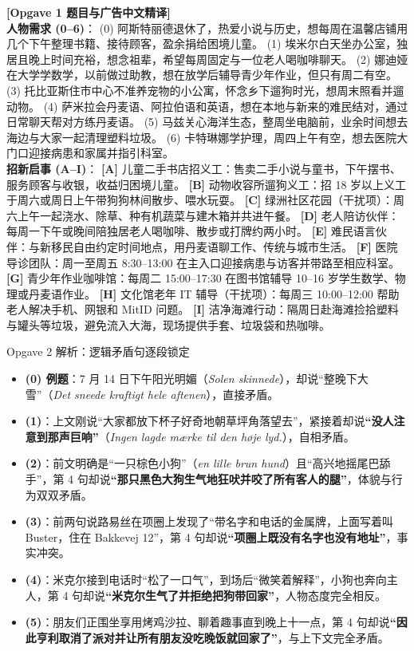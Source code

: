 \begin{transbox}
\small
\textbf{\color{NCDTeal}[Opgave 1 题目与广告中文精译]}\\
\textbf{人物需求 (0--6)}：
(0) 阿斯特丽德退休了，热爱小说与历史，想每周在温馨店铺用几个下午整理书籍、接待顾客，盈余捐给困境儿童。
(1) 埃米尔白天坐办公室，独居且晚上时间充裕，想念祖辈，希望每周固定与一位老人喝咖啡聊天。
(2) 娜迪娅在大学学数学，以前做过助教，想在放学后辅导青少年作业，但只有周二有空。
(3) 托比亚斯住市中心不准养宠物的小公寓，怀念乡下遛狗时光，想周末照看并遛动物。
(4) 萨米拉会丹麦语、阿拉伯语和英语，想在本地与新来的难民结对，通过日常聊天帮对方练丹麦语。
(5) 马兹关心海洋生态，整周坐电脑前，业余时间想去海边与大家一起清理塑料垃圾。
(6) 卡特琳娜学护理，周四上午有空，想去医院大门口迎接病患和家属并指引科室。\\
\textbf{招新启事 (A--I)}：
\textbf{[A]} 儿童二手书店招义工：售卖二手小说与童书，下午摆书、服务顾客与收银，收益归困境儿童。
\textbf{[B]} 动物收容所遛狗义工：招 18 岁以上义工于周六或周日上午带狗狗林间散步、喂水玩耍。
\textbf{[C]} 绿洲社区花园（干扰项）：周六上午一起浇水、除草、种有机蔬菜与建木箱并共进午餐。
\textbf{[D]} 老人陪访伙伴：每周一下午或晚间陪独居老人喝咖啡、散步或打牌约两小时。
\textbf{[E]} 难民语言伙伴：与新移民自由约定时间地点，用丹麦语聊工作、传统与城市生活。
\textbf{[F]} 医院导诊团队：周一至周五 8:30--13:00 在主入口迎接病患与访客并带路至相应科室。
\textbf{[G]} 青少年作业咖啡馆：每周二 15:00--17:30 在图书馆辅导 10--16 岁学生数学、物理或丹麦语作业。
\textbf{[H]} 文化馆老年 IT 辅导（干扰项）：每周三 10:00--12:00 帮助老人解决手机、网银和 MitID 问题。
\textbf{[I]} 洁净海滩行动：隔周日赴海滩捡拾塑料与罐头等垃圾，避免流入大海，现场提供手套、垃圾袋和热咖啡。
\end{transbox}

\begin{tipbox}{Opgave 2 解析：逻辑矛盾句逐段锁定}
\small
\begin{itemize}
  \item \textbf{(0) 例题}：7 月 14 日下午阳光明媚（\textit{Solen skinnede}），却说“整晚下大雪”（\textit{Det sneede kraftigt hele aftenen}），直接矛盾。
  \item \textbf{(1)}：上文刚说“大家都放下杯子好奇地朝草坪角落望去”，紧接着却说\textbf{“没人注意到那声巨响”}（\textit{Ingen lagde mærke til den høje lyd.}），自相矛盾。
  \item \textbf{(2)}：前文明确是“一只棕色小狗”（\textit{en lille brun hund}）且“高兴地摇尾巴舔手”，第 4 句却说\textbf{“那只黑色大狗生气地狂吠并咬了所有客人的腿”}，体貌与行为双双矛盾。
  \item \textbf{(3)}：前两句说路易丝在项圈上发现了“带名字和电话的金属牌，上面写着叫 Buster，住在 Bakkevej 12”，第 4 句却说\textbf{“项圈上既没有名字也没有地址”}，事实冲突。
  \item \textbf{(4)}：米克尔接到电话时“松了一口气”，到场后“微笑着解释”，小狗也奔向主人，第 4 句却说\textbf{“米克尔生气了并拒绝把狗带回家”}，人物态度完全相反。
  \item \textbf{(5)}：朋友们正围坐享用烤鸡沙拉、聊着趣事直到晚上十一点，第 4 句却说\textbf{“因此亨利取消了派对并让所有朋友没吃晚饭就回家了”}，与上下文完全矛盾。
\end{itemize}
\end{tipbox}


